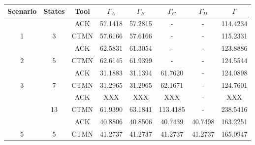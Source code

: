 \documentclass[a4paper]{article}
\begin{document}
	\begin{table}[h!]
		\centering
		\begin{tabular}{|c|c|c|c|c|c|c|c|}
		\hline
		\textbf{Scenario}                           & \textbf{States}                              & \textbf{Tool} & $\Gamma_A$ & $\Gamma_B$ & $\Gamma_C$ & $\Gamma_D$ & $\Gamma$   \\ \hline
		                                            &                                              & ACK       & 57.1418    & 57.2815    & -          & -          & 114.4234   \\ \cline{3-8} 
		\multirow{-2}{*}{1}                         & \multirow{-2}{*}{3}                          & CTMN          & 57.6166    & 57.6166    & -          & -          & 115.2331   \\ \hline
		                                            &                                              & ACK       & 62.5831    & 61.3054   & -          & -          & 123.8886   \\ \cline{3-8} 
		\multirow{-2}{*}{2}                         & \multirow{-2}{*}{5}                          & CTMN          & 62.6145    & 61.9399    & -          & -          & 124.5544   \\ \hline
		                                            &                                              & ACK       & 31.1883    & 31.1394    & 61.7620    & -          & 124.0898   \\ \cline{3-8} 
		\multirow{-2}{*}{3}                         & \multirow{-2}{*}{7}                          & CTMN          & 31.2965    & 31.2965    & 62.1671    & -          & 124.7601   \\ \hline
		\rowcolor[HTML]{FFCCC9} 
		\cellcolor[HTML]{FFCCC9}                    & \cellcolor[HTML]{FFCCC9}                     & ACK       & XXX    & XXX  & XXX   & -          & XXX \\ \cline{3-8} 
		\rowcolor[HTML]{FFCCC9} 
		\multirow{-2}{*}{\cellcolor[HTML]{FFCCC9}4} & \multirow{-2}{*}{\cellcolor[HTML]{FFCCC9}13} & CTMN          & 61.9390    & 63.1841    & 113.4185   & -          & 238.5416   \\ \hline
		                                            &                                              & ACK       & 40.8806   & 40.8506    & 40.7439    & 40.7498    & 163.2251   \\ \cline{3-8} 
		\multirow{-2}{*}{5}                         & \multirow{-2}{*}{5}                          & CTMN          & 41.2737    & 41.2737    & 41.2737    & 41.2737    & 165.0947   \\ \hline

\end{tabular}
\end{table}
\end{document}
